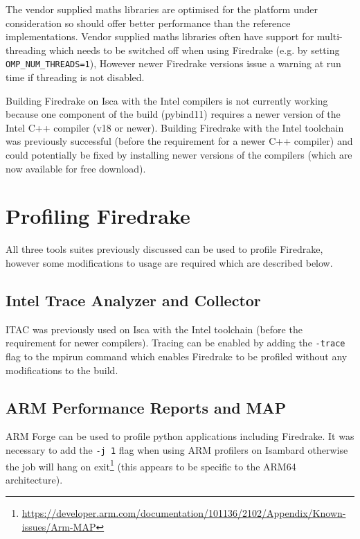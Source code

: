 \documentclass[a4paper,titlepage]{article}
\begin{document}
The vendor supplied maths libraries are optimised for the platform under consideration so should offer better performance than the reference implementations. 
Vendor supplied maths libraries often have support for multi-threading which needs to be switched off when using Firedrake (e.g. by setting \verb+OMP_NUM_THREADS=1+), However newer Firedrake versions issue a warning at run time if threading is not disabled. 

Building Firedrake on Isca with the Intel compilers is not currently working because one component of the build (pybind11) requires a newer version of the Intel C++ compiler (v18 or newer). Building Firedrake with the Intel toolchain was previously successful (before the requirement for a newer C++ compiler) and could potentially be fixed by installing newer versions of the compilers (which are now available for free download).


\section{Profiling Firedrake}
\label{section:profiling_firedrake}

All three tools suites previously discussed can be used to profile Firedrake, however some modifications to usage are required which are described below.


\subsection{Intel Trace Analyzer and Collector}

ITAC was previously used on Isca with the Intel toolchain (before the requirement for newer compilers). Tracing can be enabled by adding the \verb+-trace+ flag to the mpirun command which enables Firedrake to be profiled without any modifications to the build. 


\subsection{ARM Performance Reports and MAP}

ARM Forge can be used to profile python applications including Firedrake. It was necessary to add the \verb+-j 1+ flag when using ARM profilers on Isambard otherwise the job will hang on exit\footnote{\url{https://developer.arm.com/documentation/101136/2102/Appendix/Known-issues/Arm-MAP}} (this appears to be specific to the ARM64 architecture).
\end{document}
